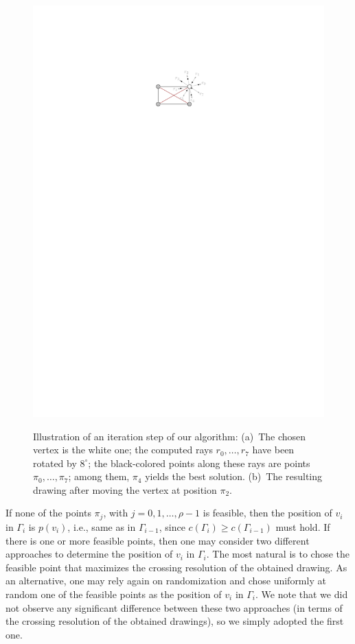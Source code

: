 \documentclass[runningheads]{llncs}
\begin{document}
\begin{figure}[t!]
{	\includegraphics[page=2, scale=0.9]{figures/algorithm}}
	\caption{%
	Illustration of an iteration step of our algorithm: 
	(a)~The chosen vertex is the white one; 
	the computed rays $r_0,\ldots,r_7$ have been rotated by $8^\circ$; 
	the black-colored points along these rays are points $\pi_0,\ldots,\pi_7$; 
	among them, $\pi_4$ yields the best solution.
	(b)~The resulting drawing after moving the vertex at position $\pi_2$.}
	\label{fig:algo}
\end{figure} 

If none of the points $\pi_j$, with $j=0,1,\ldots,\rho-1$ is feasible, then the position of $v_i$ in $\Gamma_i$ is $p(v_i)$, i.e., same as in $\Gamma_{i-1}$, since $c(\Gamma_i) \geq c(\Gamma_{i-1})$ must hold. If there is one or more feasible points, then one may consider two different approaches to determine the position of $v_i$ in $\Gamma_i$. The most natural is to chose the feasible point that maximizes the crossing resolution of the obtained drawing. As an alternative, one may rely again on randomization and chose uniformly at random one of the feasible points as the position of $v_i$ in $\Gamma_i$. We note that we did not observe any significant difference between these two approaches (in terms of the crossing resolution of the obtained drawings), so we simply adopted the first one. 
\end{document}
